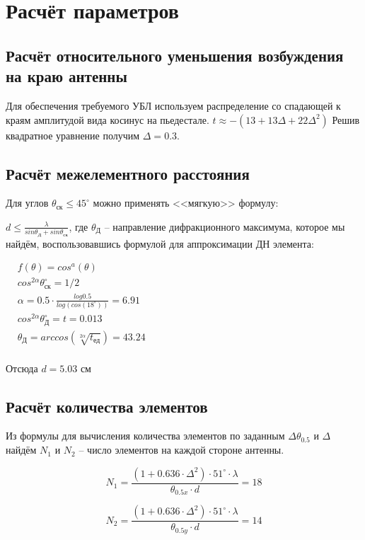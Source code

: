 \chapter{Расчёт параметров}

\section{Расчёт относительного уменьшения возбуждения на краю антенны}

Для обеспечения требуемого УБЛ используем распределение со спадающей к краям амплитудой вида косинус на пьедестале.
$t\approx-(13+13\Delta+22\Delta^2)$
Решив квадратное уравнение получим $\Delta=0.3$.
\section{Расчёт межелементного расстояния}
Для углов $\theta_\text{ск}\leq45^\circ$ можно применять <<мягкую>>  формулу:

$\displaystyle d\leq\frac{\lambda}{sin\theta_\text{Д}+sin\theta_\text{ск}}$, где $\theta_\text{Д}$ -- направление дифракционного максимума, которое мы найдём, воспользовавшись формулой для аппроксимации ДН элемента: \par\noindent
$\begin{aligned}
&f(\theta)=cos^a(\theta) &\\
&cos^{2\alpha}\theta^{\circ}_{\text{ск}}=1/2 &\\
&\alpha=0.5\cdot\frac{log0.5}{log(cos(18^\circ))}=6.91 &\\
&cos^{2\alpha}\theta^{\circ}_{\text{Д}}=t=0.013 &\\
&\theta_\text{Д}=arccos(\sqrt[2\alpha]{t_\text{ед}})=43.24 &\\
\end{aligned}$


Отсюда $d=5.03 \text{ см}$


\section{Расчёт количества элементов}

Из формулы для вычисления количества элементов по заданным $\Delta\theta_{0.5}$ и $\Delta$ найдём $N_1$ и $N_2$ -- число элементов на каждой стороне антенны.

\[N_1=\frac{(1+0.636\cdot\Delta^2)\cdot51^\circ\cdot\lambda}{\theta_{0.5x}\cdot d}=18\]

\[N_2=\frac{(1+0.636\cdot\Delta^2)\cdot51^\circ\cdot\lambda}{\theta_{0.5y}\cdot d}=14\] 

